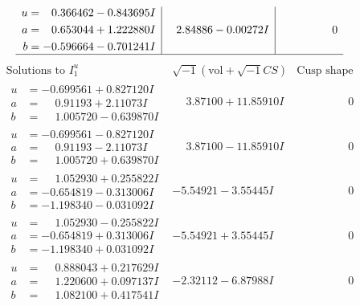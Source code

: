 \documentclass[1p]{elsarticle_modified}
\theoremstyle{definition}
\newcommand{\I}{\sqrt{-1}}
\begin{document}
$$\begin{array}{c|c|c}
\begin{aligned}
u &= \phantom{-}0.366462 - 0.843695 I \\
a &= \phantom{-}0.653044 + 1.222880 I \\
b &= -0.596664 - 0.701241 I\end{aligned}
 & \phantom{-}2.84886 - 0.00272 I & \phantom{-0.000000 } 0\\
 \hline 
 \end{array}$$\newpage$$\begin{array}{c|c|c}  
\text{Solutions to }I^u_{1}& \I (\text{vol} + \sqrt{-1}CS) & \text{Cusp shape}\\
 \hline 
\begin{aligned}
u &= -0.699561 + 0.827120 I \\
a &= \phantom{-}0.91193 + 2.11073 I \\
b &= \phantom{-}1.005720 - 0.639870 I\end{aligned}
 & \phantom{-}3.87100 + 11.85910 I & \phantom{-0.000000 } 0 \\ \hline\begin{aligned}
u &= -0.699561 - 0.827120 I \\
a &= \phantom{-}0.91193 - 2.11073 I \\
b &= \phantom{-}1.005720 + 0.639870 I\end{aligned}
 & \phantom{-}3.87100 - 11.85910 I & \phantom{-0.000000 } 0 \\ \hline\begin{aligned}
u &= \phantom{-}1.052930 + 0.255822 I \\
a &= -0.654819 - 0.313006 I \\
b &= -1.198340 - 0.031092 I\end{aligned}
 & -5.54921 - 3.55445 I & \phantom{-0.000000 } 0 \\ \hline\begin{aligned}
u &= \phantom{-}1.052930 - 0.255822 I \\
a &= -0.654819 + 0.313006 I \\
b &= -1.198340 + 0.031092 I\end{aligned}
 & -5.54921 + 3.55445 I & \phantom{-0.000000 } 0 \\ \hline\begin{aligned}
u &= \phantom{-}0.888043 + 0.217629 I \\
a &= \phantom{-}1.220600 + 0.097137 I \\
b &= \phantom{-}1.082100 + 0.417541 I\end{aligned}
 & -2.32112 - 6.87988 I & \phantom{-0.000000 } 0 \\ \hline\begin{aligned}

\end{aligned}
\end{array}$$
\end{document}
